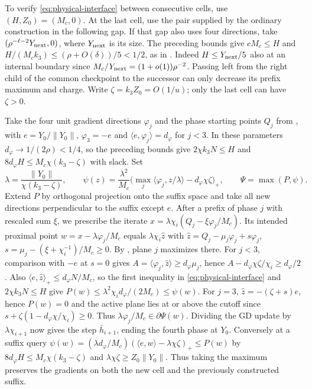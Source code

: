 \documentclass[11pt]{article}
\theoremstyle{definition}
\begin{document}
To verify \eqref{eq:physical-interface} between consecutive cells, use $(H,Z_0)=(M_c,0)$. At the last cell, use the pair supplied by the ordinary construction in the
following gap. If that gap also uses four directions, take
\((\rho^{-\ell-2}Y_{\rm next},0)\), where \(Y_{\rm next}\) is its size.
The preceding bounds give $cM_c\le H$ and $H/(M_ck_3)\le(\rho+O(\delta))/5<1/2$, as in \cite[(6.59)--(6.61)]{JH}. Indeed $H\le Y_{\rm next}/5$ also at an internal boundary since $M_c/Y_{\rm next}=(1+o(1))\rho^{-2}$. Passing left from the right child of the common checkpoint to the successor can only decrease its prefix maximum and charge. Write \(\zeta=k_3 Z_0=O(1/u)\); only the last cell can have \(\zeta>0\).

Take the four unit gradient directions $\varphi_j$ and the phase starting points $Q_j$ from \cite[Lemma 6.1]{JH}, with $e=Y_0/\|Y_0\|$, $\varphi_3=-e$ and $\langle e,\varphi_j\rangle=d_\varphi$ for $j<3$. In these parameters $d_\varphi\to1/(2\rho)<1/4$, so the preceding bounds give $2\chi k_3 N\le H$ and $8d_\varphi H\le M_c\chi(k_3-\zeta)$ with slack. Set
\[
 \lambda=\frac{\|Y_0\|}{\chi(k_3-\zeta)},\qquad
 \psi(z)=\frac{\lambda^2}{M_c}\big(\max_j\langle\varphi_j,z/\lambda\rangle-d_\varphi\chi\zeta\big)_+,
 \qquad \Psi=\max(P,\psi).
\]
Extend $P$ by orthogonal projection onto the suffix space and take all new directions perpendicular to the suffix except $e$. After a prefix of phase \(j\) with rescaled sum \(\xi\), we prescribe the iterate $x=\lambda\chi_i(Q_j-\xi\varphi_j/M_c)$. Its intended proximal point $w=x-\lambda\varphi_j/M_c$ equals $\lambda\chi_i\widehat z$ with
$\widehat z=Q_j-\mu_j\varphi_j+s\varphi_j$, $s=\mu_j-(\xi+\chi_i^{-1})/M_c\ge0$.
By \cite[Lemma 6.1]{JH}, plane $j$ maximizes there. For $j<3$, comparison with $-e$ at $s=0$ gives $A=\langle\varphi_j,\widehat z\rangle\ge d_\varphi\mu_j$, hence $A-d_\varphi\chi\zeta/\chi_i\ge d_\varphi/2$. Also $\langle e,\widehat z\rangle_+\le d_\varphi N/M_c$, so the first inequality in \eqref{eq:physical-interface} and $2\chi k_3N\le H$ give $P(w)\le\lambda^2\chi_i d_\varphi/(2M_c)\le\psi(w)$. For $j=3$, $\widehat z=-(\zeta+s)e$, hence $P(w)=0$ and the active plane lies at or above the cutoff since $s+\zeta(1-d_\varphi\chi/\chi_i)\ge0$. Thus $\lambda\varphi_j/M_c\in\partial\Psi(w)$. Dividing the GD update by $\lambda\chi_{i+1}$ now gives the step $\bar h_{i+1}$, ending the fourth phase at $Y_0$. Conversely at a suffix query $\psi(w)=(\lambda d_\varphi/M_c)(\langle e,w\rangle-\lambda\chi\zeta)_+\le P(w)$ by $8d_\varphi H\le M_c\chi(k_3-\zeta)$ and $\lambda\chi\zeta\ge Z_0\|Y_0\|$. Thus taking the maximum preserves the gradients on both the new cell
and the previously constructed suffix.
\end{document}
